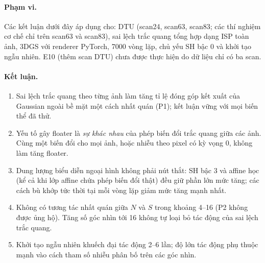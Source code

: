 \documentclass[11pt,a4paper]{article}
\begin{document}
\paragraph{Phạm vi.} Các kết luận dưới đây áp dụng cho: DTU (scan24, scan63, scan83; các thí nghiệm cơ chế chỉ trên scan63 và scan83), sai lệch trắc quang tổng hợp dạng ISP toàn ảnh, 3DGS với renderer PyTorch, 7000 vòng lặp, chủ yếu SH bậc 0 và khởi tạo ngẫu nhiên. E10 (thêm scan DTU) chưa được thực hiện do dữ liệu chỉ có ba scan.

\paragraph{Kết luận.}
\begin{enumerate}
  \item Sai lệch trắc quang theo từng ảnh làm tăng tỉ lệ đóng góp kết xuất của Gaussian ngoài bề mặt một cách nhất quán (P1); kết luận vững với mọi biến thể đã thử.
  \item Yếu tố gây floater là \emph{sự khác nhau} của phép biến đổi trắc quang giữa các ảnh. Cùng một biến đổi cho mọi ảnh, hoặc nhiễu theo pixel có kỳ vọng 0, không làm tăng floater.
  \item Dung lượng biểu diễn ngoại hình không phải nút thắt: SH bậc 3 và affine học (kể cả khi lớp affine chứa phép biến đổi thật) đều giữ phần lớn mức tăng; các cách bù khớp tức thời tại mỗi vòng lặp giảm mức tăng mạnh nhất.
  \item Không có tương tác nhất quán giữa $N$ và $S$ trong khoảng 4--16 (P2 không được ủng hộ). Tăng số góc nhìn tới 16 không tự loại bỏ tác động của sai lệch trắc quang.
  \item Khởi tạo ngẫu nhiên khuếch đại tác động 2--6 lần; độ lớn tác động phụ thuộc mạnh vào cách tham số nhiễu phân bố trên các góc nhìn.
\end{enumerate}
\end{document}
